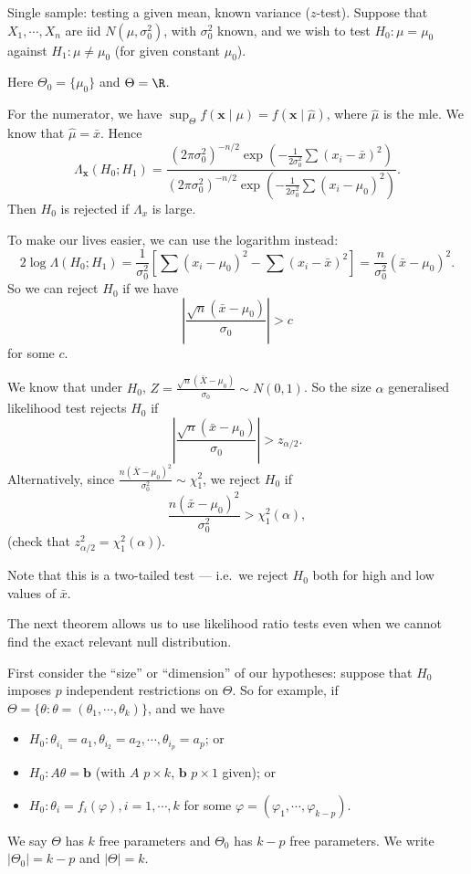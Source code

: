 \documentclass[a4paper]{article}
\begin{document}
\begin{eg}
  Single sample: testing a given mean, known variance ($z$-test). Suppose that $X_1, \cdots, X_n$ are iid $N(\mu, \sigma_0^2)$, with $\sigma_0^2$ known, and we wish to test $H_0: \mu = \mu_0$ against $H_1: \mu \not= \mu_0$ (for given constant $\mu_0$).

  Here $\Theta_0 = \{\mu_0\}$ and $\Theta = \R$.

  For the numerator, we have $\sup_\Theta f(\mathbf{x}\mid \mu) = f(\mathbf{x}\mid \hat{\mu})$, where $\hat{\mu}$ is the mle. We know that $\hat{\mu} = \bar x$. Hence
  \[
    \Lambda_\mathbf{x}(H_0; H_1) = \frac{(2\pi\sigma_0^2)^{-n/2}\exp\left(-\frac{1}{2\sigma^2_0}\sum(x_i - \bar x)^2\right)}{(2\pi\sigma_0^2)^{-n/2}\exp\left(-\frac{1}{2\sigma^2_0}\sum(x_i - \mu_0)^2\right)}.
  \]
  Then $H_0$ is rejected if $\Lambda_x$ is large.

  To make our lives easier, we can use the logarithm instead:
  \[
    2\log \Lambda(H_0;H_1) = \frac{1}{\sigma_0^2}\left[\sum (x_i - \mu_0)^2 - \sum (x_i - \bar x)^2\right] = \frac{n}{\sigma_0^2}(\bar x - \mu_0)^2.
  \]
  So we can reject $H_0$ if we have
  \[
    \left|\frac{\sqrt{n}(\bar x - \mu_0)}{\sigma_0}\right| > c
  \]
  for some $c$.

  We know that under $H_0$, $\displaystyle Z = \frac{\sqrt{n}(\bar X - \mu_0)}{\sigma_0}\sim N(0, 1)$. So the size $\alpha$ generalised likelihood test rejects $H_0$ if
  \[
    \left|\frac{\sqrt{n}(\bar x - \mu_0)}{\sigma_0}\right| > z_{\alpha/2}.
  \]
  Alternatively, since $\displaystyle \frac{n(\bar X - \mu_0)^2}{\sigma_0^2}\sim \chi_1^2$, we reject $H_0$ if
  \[
    \frac{n(\bar x - \mu_0)^2}{\sigma_0^2} > \chi_1^2(\alpha),
  \]
  (check that $z_{\alpha/2}^2 = \chi_1^2(\alpha)$).

  Note that this is a two-tailed test --- i.e.\ we reject $H_0$ both for high and low values of $\bar x$.
\end{eg}

The next theorem allows us to use likelihood ratio tests even when we cannot find the exact relevant null distribution.

First consider the ``size'' or ``dimension'' of our hypotheses: suppose that $H_0$ imposes $p$ independent restrictions on $\Theta$. So for example, if $\Theta = \{\theta: \theta = (\theta_1, \cdots, \theta_k)\}$, and we have
\begin{itemize}
  \item $H_0: \theta_{i_1} = a_1, \theta_{i_2} = a_2, \cdots , \theta_{i_p} = a_p$; or
  \item $H_0: A\theta = \mathbf{b}$ (with $A$ $p\times k$, $\mathbf{b}$ $p\times 1$ given); or
  \item $H_0: \theta_i = f_i(\varphi), i = 1, \cdots, k$ for some $\varphi = (\varphi_1, \cdots, \varphi_{k - p})$.
\end{itemize}
We say $\Theta$ has $k$ free parameters and $\Theta_0$ has $k - p$ free parameters. We write $|\Theta_0| = k - p$ and $|\Theta| = k$.
\end{document}
